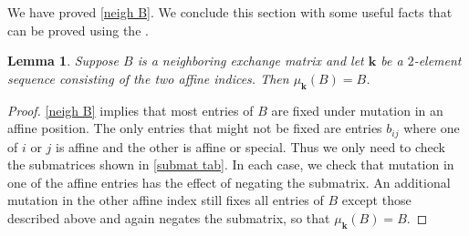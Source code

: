 \documentclass{amsart}
\newtheorem{lemma}[proposition]{Lemma}
\theoremstyle{definition}
\theoremstyle{remark}
\numberwithin{equation}{section}
\newcommand{\0}{{\mathbf{0}}}
\newcommand{\kk}{{\boldsymbol{k}}}
\begin{document}
We have proved \cref{neigh B}.
We conclude this section with some useful facts that can be proved using the .

\begin{lemma}\label{affine mut}
Suppose $B$ is a neighboring exchange matrix and let $\kk$ be a $2$-element sequence consisting of the two affine indices. 
Then $\mu_\kk(B)=B$.
\end{lemma}
\begin{proof}
\cref{neigh B} implies that most entries of $B$ are fixed under mutation in an affine position.
The only entries that might not be fixed are entries $b_{ij}$ where one of $i$ or $j$ is affine and the other is affine or special.
Thus we only need to check the submatrices shown in \cref{submat tab}.
In each case, we check that mutation in one of the affine entries has the effect of negating the submatrix.
An additional mutation in the other affine index still fixes all entries of $B$ except those described above and again negates the submatrix, so that $\mu_\kk(B)=B$.  

\end{proof}
\end{document}
